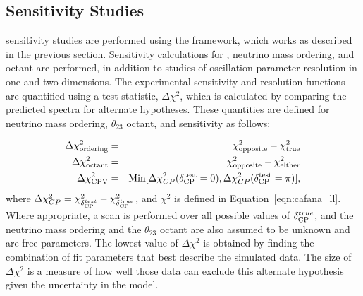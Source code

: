 \subsection{ Sensitivity Studies}
\label{sect:methods-dunefits}

 sensitivity studies are performed using the  framework, which works as described in the previous section. Sensitivity calculations for , neutrino mass ordering, and octant are performed, in addition to studies of oscillation parameter resolution in one and two dimensions.
The experimental sensitivity and resolution functions are quantified using a test statistic, $\Delta\chi^2$, which is calculated by comparing the predicted spectra for alternate hypotheses. These quantities are defined for neutrino mass ordering, $\theta_{23}$ octant, and  sensitivity as follows:

\begin{eqnarray}
\Delta\chi^2_{\textrm{ordering}} & = & \chi^2_{\textrm{opposite}} - \chi^2_{\textrm{true}} \label{eq:dx2_MH}\\
\Delta\chi^2_{\textrm{octant}} & = & \chi^2_{\textrm{opposite}} - \chi^2_{\textrm{either}} \\
\Delta\chi^2_{\textrm{CPV}} & = & \textrm{Min}[\Delta\chi^2_{CP}(\delta_{\rm CP}^{\textrm{test}}=0),\Delta\chi^2_{CP}(\delta_{\rm CP}^{\textrm{test}}=\pi)],
\end{eqnarray}
where $\Delta\chi^2_{CP} = \chi^{2}_{\delta_{\rm CP}^{test}} - \chi^2_{\delta_{\rm CP}^{true}}$, and $\chi^2$ is defined in Equation~\ref{eqn:cafana_ll}. Where appropriate, a scan is performed over all possible values of $\delta_{\rm CP}^{true}$, and the neutrino mass ordering and the $\theta_{23}$ octant are also assumed to be unknown and are free parameters. The lowest value of $\Delta\chi^2$ is obtained by finding the combination of fit parameters that best describe the simulated data. The size of $\Delta\chi^2$ is a measure of how well those data can exclude this alternate hypothesis given the uncertainty in the model. 


